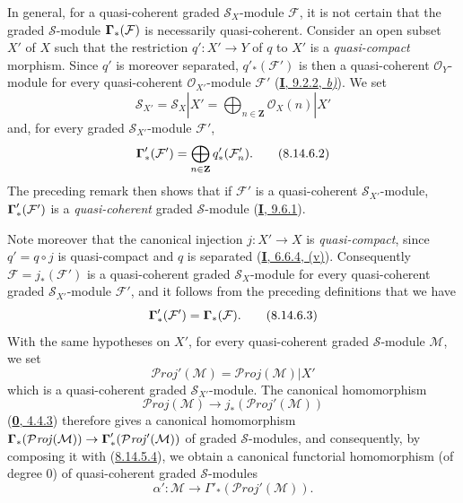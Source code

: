 \begin{env}[8.14.6]
\label{II.8.14.6}
In general, for a quasi-coherent graded $\mathcal{S}_X$-module
$\mathcal{F}$, it is not certain that the graded $\mathcal{S}$-module
$\boldsymbol{\Gamma}_*(\mathcal{F})$ is necessarily quasi-coherent. Consider an
open subset $X'$ of $X$ such that the restriction $q':X'\to Y$ of $q$ to $X'$
is a \emph{quasi-compact} morphism. Since $q'$ is moreover separated,
$q'_*(\mathcal{F}')$ is then a quasi-coherent $\mathcal{O}_Y$-module for
every quasi-coherent $\mathcal{O}_{X'}$-module $\mathcal{F}'$
(\hyperref[I.9.2.2]{\textbf{I}, 9.2.2, \emph{b)}}). We set
\begin{equation}
\label{II.8.14.6.1}
  \mathcal{S}_{X'}=\mathcal{S}_X|X'
  =\bigoplus_{n\in\mathbf{Z}}\mathcal{O}_X(n)|X'
\tag{8.14.6.1}
\end{equation}
and, for every graded $\mathcal{S}_{X'}$-module $\mathcal{F}'$,
\begin{equation}
\label{II.8.14.6.2}
  \boldsymbol{\Gamma}'_*(\mathcal{F}')=
  \bigoplus_{n\in\mathbf{Z}}q'_*(\mathcal{F}'_n).
\tag{8.14.6.2}
\end{equation}
The preceding remark then shows that if $\mathcal{F}'$ is a
quasi-coherent $\mathcal{S}_{X'}$-module, $\boldsymbol{\Gamma}'_*(\mathcal{F}')$ is a
\emph{quasi-coherent} graded $\mathcal{S}$-module
(\hyperref[I.9.6.1]{\textbf{I}, 9.6.1}).

Note moreover that the canonical injection $j:X'\to X$ is
\emph{quasi-compact}, since $q'=q\circ j$ is quasi-compact and $q$ is separated
(\hyperref[I.6.6.4]{\textbf{I}, 6.6.4, (v)}). Consequently
$\mathcal{F}=j_*(\mathcal{F}')$ is a quasi-coherent graded
$\mathcal{S}_X$-module for every quasi-coherent graded
$\mathcal{S}_{X'}$-module $\mathcal{F}'$, and it follows from the preceding
definitions that we have
\begin{equation}
\label{II.8.14.6.3}
  \boldsymbol{\Gamma}'_*(\mathcal{F}')=\boldsymbol{\Gamma}_*(\mathcal{F}).
\tag{8.14.6.3}
\end{equation}
With the same hypotheses on $X'$, for every quasi-coherent graded
$\mathcal{S}$-module $\mathcal{M}$, we set
\begin{equation}
\label{II.8.14.6.4}
  \mathcal{P}\mathit{roj}'(\mathcal{M})
  =\mathcal{P}\mathit{roj}(\mathcal{M})|X'
\tag{8.14.6.4}
\end{equation}
which is a quasi-coherent graded $\mathcal{S}_{X'}$-module. The canonical
homomorphism
\[
  \mathcal{P}\mathit{roj}(\mathcal{M})\to
  j_*(\mathcal{P}\mathit{roj}'(\mathcal{M}))
\]
(\hyperref[0.4.4.3]{\textbf{0}, 4.4.3}) therefore gives a canonical homomorphism
$\boldsymbol{\Gamma}_*(\mathcal{P}\mathit{roj}(\mathcal{M}))\to
\boldsymbol{\Gamma}'_*(\mathcal{P}\mathit{roj}'(\mathcal{M}))$ of graded
$\mathcal{S}$-modules, and consequently, by composing it with
(\hyperref[II.8.14.5.4]{8.14.5.4}), we obtain a canonical functorial
homomorphism (of degree $0$) of quasi-coherent graded $\mathcal{S}$-modules
\begin{equation}
\label{II.8.14.6.5}
  \alpha':\mathcal{M}\to
  \Gamma'_*(\mathcal{P}\mathit{roj}'(\mathcal{M})).
\tag{8.14.6.5}
\end{equation}
\end{env}

